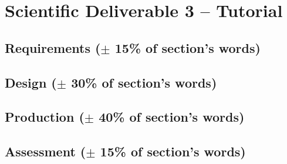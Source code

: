 \section{Scientific Deliverable 3 -- Tutorial}
% 
\subsection{Requirements ($\pm$ 15\% of section's words)}

\subsection{Design ($\pm$ 30\% of section's words)}

\subsection{Production ($\pm$ 40\% of section's words)}

\subsection{Assessment ($\pm$ 15\% of section's words)}


